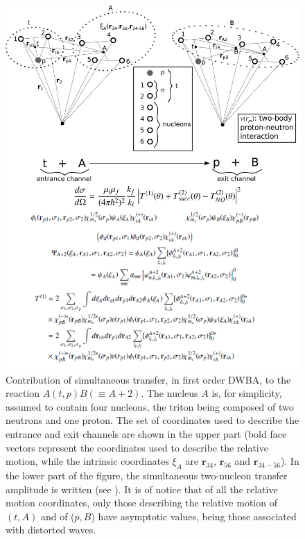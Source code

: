 \begin{figure}
\centerline{\includegraphics*[width=\textwidth,angle=0]{nutshell/figs/fig_alpha.pdf}}
\caption{Contribution of simultaneous transfer, in first order DWBA, to the reaction $A(t,p)B(\equiv A+2)$. The nucleus $A$ is, for simplicity, assumed to contain four nucleons, the triton being composed of two neutrons and one proton. The set of coordinates used to describe the entrance and exit channels are shown in the upper part (bold face vectors represent the coordinates used to describe the relative motion, while the intrinsic coordinates $\xi_A$ are $\mathbf r_{34}$, $\mathbf r_{56}$ and $\mathbf r_{34-56}$). In the lower part of the figure, the simultaneous two-nucleon transfer amplitude is written (see \cite{Potel:13b}). It is of notice that of all the relative motion coordinates, only those describing the relative motion of $(t,A)$ and of ($p,B$) have asymptotic values, being those associated with distorted waves.}\label{fig_alpha}
\end{figure}
